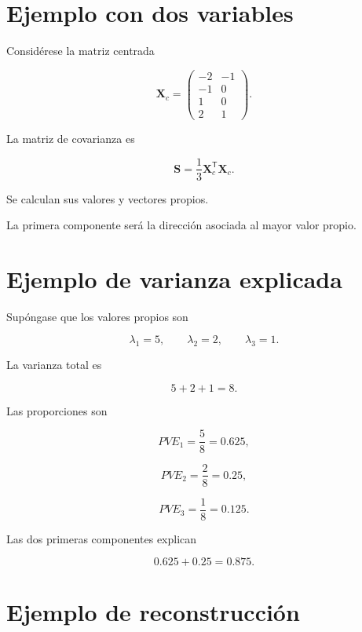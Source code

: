 \documentclass[
  spanish,
  10.5pt,
  letterpaper,
  DIV=11,
  numbers=noendperiod,
  oneside,
  open=any]{scrreprt}
\theoremstyle{definition}
\theoremstyle{definition}
\theoremstyle{plain}
\theoremstyle{remark}
\begin{document}
\section*{Ejemplo con dos variables}\label{ejemplo-con-dos-variables}


Considérese la matriz centrada

\[
\mathbf{X}_c
=
\begin{pmatrix}
-2 & -1\\
-1 & 0\\
1 & 0\\
2 & 1
\end{pmatrix}.
\]

La matriz de covarianza es

\[
\mathbf{S}
=
\frac{1}{3}
\mathbf{X}_c^{\mathsf T}
\mathbf{X}_c.
\]

Se calculan sus valores y vectores propios.

La primera componente será la dirección asociada al mayor valor propio.

\section*{Ejemplo de varianza
explicada}\label{ejemplo-de-varianza-explicada}


Supóngase que los valores propios son

\[
\lambda_1=5,
\qquad
\lambda_2=2,
\qquad
\lambda_3=1.
\]

La varianza total es

\[
5+2+1=8.
\]

Las proporciones son

\[
PVE_1
=
\frac{5}{8}
=
0.625,
\]

\[
PVE_2
=
\frac{2}{8}
=
0.25,
\]

\[
PVE_3
=
\frac{1}{8}
=
0.125.
\]

Las dos primeras componentes explican

\[
0.625+0.25
=
0.875.
\]

\section*{Ejemplo de reconstrucción}\label{ejemplo-de-reconstrucciuxf3n}
\end{document}
